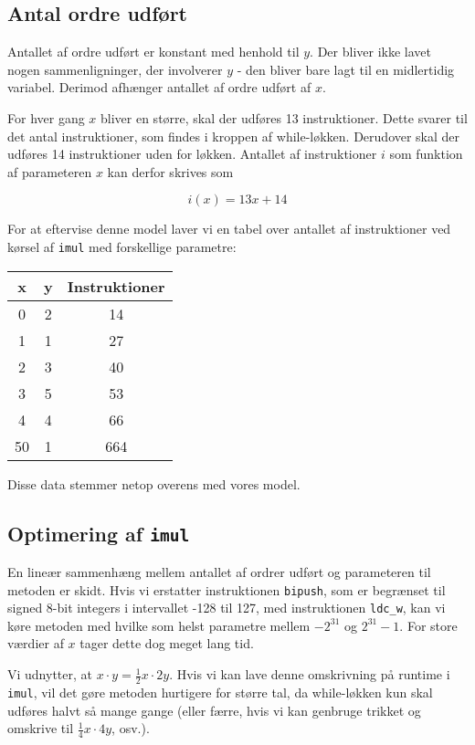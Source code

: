 \documentclass[12pt,a4paper]{article}
\newcommand{\imul}{\texttt{imul}}
\begin{document}
\subsection{Antal ordre udført}
Antallet af ordre udført er konstant med henhold til $y$. Der bliver ikke lavet
nogen sammenligninger, der involverer $y$ - den bliver bare lagt til en
midlertidig variabel. Derimod afhænger antallet af ordre udført af $x$.

For hver gang $x$ bliver en større, skal der udføres 13 instruktioner. Dette
svarer til det antal instruktioner, som findes i kroppen af while-løkken.
Derudover skal der udføres 14 instruktioner uden for løkken. Antallet af instruktioner $i$ som funktion af parameteren $x$ kan derfor skrives som

\[i(x) = 13x + 14\]

For at eftervise denne model laver vi en tabel over antallet af instruktioner
ved kørsel af \imul{} med forskellige parametre:

\begin{tabular}{|c|c|c|}
\hline
x & y & Instruktioner \\ \hline
0 & 2 & 14  \\ \hline
1 & 1 & 27  \\ \hline
2 & 3 & 40  \\ \hline
3 & 5 & 53  \\ \hline
4 & 4 & 66  \\ \hline
50& 1 & 664 \\ \hline

\end{tabular}

Disse data stemmer netop overens med vores model.

\subsection{Optimering af \imul{}}

En lineær sammenhæng mellem antallet af ordrer udført og parameteren til
metoden er skidt. Hvis vi erstatter instruktionen \texttt{bipush}, som er
begrænset til signed 8-bit integers i intervallet -128 til 127, med
instruktionen \texttt{ldc\_w}, kan vi køre metoden med hvilke som helst
parametre mellem $-2^{31}$ og $2^{31}-1$. For store værdier af $x$ tager dette
dog meget lang tid.

Vi udnytter, at $x\cdot y=\frac 12x\cdot2y$. Hvis vi kan lave denne omskrivning
på runtime i \imul{}, vil det gøre metoden hurtigere for større tal, da
while-løkken kun skal udføres halvt så mange gange (eller færre, hvis vi kan
genbruge trikket og omskrive til $\frac14x\cdot4y$, osv.).
\end{document}
